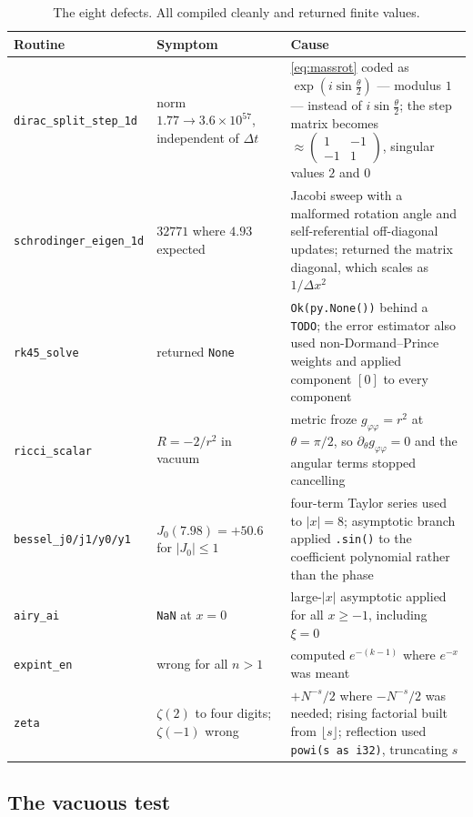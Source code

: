 \documentclass[11pt,a4paper]{article}
\theoremstyle{plain}
\theoremstyle{definition}
\begin{document}
\begin{table}[h]
\centering\footnotesize
\begin{tabular}{@{}p{3.45cm}p{3.5cm}p{7.15cm}@{}}
\toprule
\textbf{Routine} & \textbf{Symptom} & \textbf{Cause} \\
\midrule
\texttt{dirac\_split\_step\_1d} & norm $1.77\to3.6\times10^{57}$, independent of $\Delta t$ &
  \eqref{eq:massrot} coded as $\exp(i\sin\tfrac\theta2)$ --- modulus $1$ --- instead of $i\sin\tfrac\theta2$; the step matrix becomes $\approx\left(\begin{smallmatrix}1&-1\\-1&1\end{smallmatrix}\right)$, singular values $2$ and $0$ \\[2pt]
\texttt{schrodinger\_eigen\_1d} & $32771$ where $4.93$ expected &
  Jacobi sweep with a malformed rotation angle and self-referential off-diagonal updates; returned the matrix diagonal, which scales as $1/\Delta x^2$ \\[2pt]
\texttt{rk45\_solve} & returned \texttt{None} &
  \texttt{Ok(py.None())} behind a \texttt{TODO}; the error estimator also used non-Dormand--Prince weights and applied component $[0]$ to every component \\[2pt]
\texttt{ricci\_scalar} & $R=-2/r^2$ in vacuum &
  metric froze $g_{\varphi\varphi}=r^2$ at $\theta=\pi/2$, so $\partial_\theta g_{\varphi\varphi}=0$ and the angular terms stopped cancelling \\[2pt]
\texttt{bessel\_j0/j1/y0/y1} & $J_0(7.98)=+50.6$ for $|J_0|\le1$ &
  four-term Taylor series used to $|x|=8$; asymptotic branch applied \texttt{.sin()} to the coefficient polynomial rather than the phase \\[2pt]
\texttt{airy\_ai} & \texttt{NaN} at $x=0$ &
  large-$|x|$ asymptotic applied for all $x\ge-1$, including $\xi=0$ \\[2pt]
\texttt{expint\_en} & wrong for all $n>1$ &
  computed $e^{-(k-1)}$ where $e^{-x}$ was meant \\[2pt]
\texttt{zeta} & $\zeta(2)$ to four digits; $\zeta(-1)$ wrong &
  $+N^{-s}/2$ where $-N^{-s}/2$ was needed; rising factorial built from $\lfloor s\rfloor$; reflection used \texttt{powi(s as i32)}, truncating $s$ \\
\bottomrule
\end{tabular}
\caption{The eight defects. All compiled cleanly and returned finite values.}
\label{tab:bugs}
\end{table}

\subsection{The vacuous test}
\end{document}
